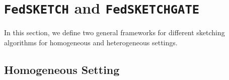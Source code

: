 \documentclass[twoside]{article}
\begin{document}
\vspace{-0.05in}
\section{\texttt{FedSKETCH} and \texttt{FedSKETCHGATE}}\label{sec:algos}
\vspace{-0.05in}
In this section, we define two general frameworks for different sketching algorithms for homogeneous and heterogeneous settings.
\vspace{-0.05in}
\subsection{Homogeneous Setting}
\vspace{-0.05in}

\end{document}
